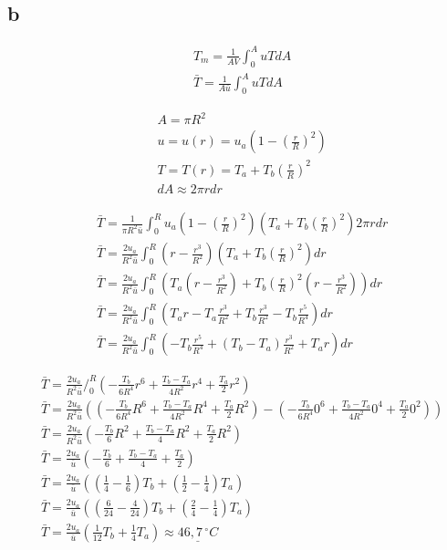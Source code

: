 \documentclass[12pt,a4paper,finnish]{article}
\begin{document}
\subsection{b} \label{46b}

\begin{framed}
 \begin{align}
  &T_m = \frac{1}{AV}\int_0^AuTdA\\
  &\bar{T} = \frac{1}{A\bar{u}}\int_0^AuTdA
 \end{align}
\end{framed}

\begin{align}
 &A = \pi R^2\\
 &u = u(r) = u_a\left(1 - \left(\frac{r}{R}\right)^2\right)\\
 &T = T(r) = T_a + T_b\left(\frac{r}{R}\right)^2\\
 &dA \approx 2\pi rdr
\end{align}

\begin{align}
  &\bar{T} = \frac{1}{\pi R^2\bar{u}}\int_0^Ru_a\left(1 - \left(\frac{r}{R}\right)^2\right)
   \left(T_a + T_b\left(\frac{r}{R}\right)^2\right)2\pi rdr\\
  &\bar{T} = \frac{2u_a}{R^2\bar{u}}\int_0^R\left(r - \frac{r^3}{R^2}\right)
   \left(T_a + T_b\left(\frac{r}{R}\right)^2\right) dr\\
  &\bar{T} = \frac{2u_a}{R^2\bar{u}}\int_0^R\left(T_a\left(r - \frac{r^3}{R^2}\right)
   + T_b\left(\frac{r}{R}\right)^2\left(r - \frac{r^3}{R^2}\right)\right)dr\\
  &\bar{T} = \frac{2u_a}{R^2\bar{u}}\int_0^R\left(T_ar - T_a\frac{r^3}{R^2}
   + T_b\frac{r^3}{R^2} - T_b\frac{r^5}{R^4}\right)dr\\
  &\bar{T} = \frac{2u_a}{R^2\bar{u}}\int_0^R\left(- T_b\frac{r^5}{R^4} 
   + (T_b - T_a)\frac{r^3}{R^2} + T_ar\right)dr
\end{align}

\begin{align}
  &\bar{T} = \frac{2u_a}{R^2\bar{u}}\bigg/_0^R\left(-\frac{T_b}{6R^4}r^6 
   + \frac{T_b - T_a}{4R^2}r^4 + \frac{T_a}{2}r^2\right)\\
  &\bar{T} = \frac{2u_a}{R^2\bar{u}}\left(\left(-\frac{T_b}{6R^4}R^6 
   + \frac{T_b - T_a}{4R^2}R^4 + \frac{T_a}{2}R^2\right)
   - \left(-\frac{T_b}{6R^4}0^6 
   + \frac{T_b - T_a}{4R^2}0^4 + \frac{T_a}{2}0^2\right)\right)\\
  &\bar{T} = \frac{2u_a}{R^2\bar{u}}\left(-\frac{T_b}{6}R^2 
   + \frac{T_b - T_a}{4}R^2 + \frac{T_a}{2}R^2\right)\\
  &\bar{T} = \frac{2u_a}{\bar{u}}\left(-\frac{T_b}{6} 
   + \frac{T_b - T_a}{4} + \frac{T_a}{2}\right)\\
  &\bar{T} = \frac{2u_a}{\bar{u}}\left(\left(\frac{1}{4} -\frac{1}{6}\right)T_b 
   + \left(\frac{1}{2} - \frac{1}{4}\right)T_a\right)\\
  &\bar{T} = \frac{2u_a}{\bar{u}}\left(\left(\frac{6}{24} -\frac{4}{24}\right)T_b 
   + \left(\frac{2}{4} - \frac{1}{4}\right)T_a\right)\\
  &\bar{T} = \frac{2u_a}{\bar{u}}\left(\frac{1}{12}T_b + \frac{1}{4}T_a\right)
   \approx \underline{46,7 \,^{\circ}C}
\end{align}
\end{document}
